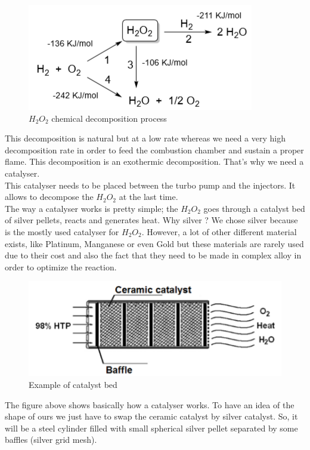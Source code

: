 \begin{figure}[H]
	\centering
	\includegraphics{H2O2}
	\caption{$H_2O_2$ chemical decomposition process}
\end{figure}

This decomposition is natural but at a low rate whereas we need a very high decomposition rate in order to feed the combustion chamber and sustain a proper flame. This decomposition is an exothermic decomposition. That's why we need a catalyser. \\

This catalyser needs to be placed between the turbo pump and the injectors. It allows to decompose the $H_2O_2$ at the last time. \\

The way a catalyser works is pretty simple; the $H_2O_2$ goes through a catalyst bed of silver pellets, reacts and generates heat. 
Why silver ? We chose silver because is the mostly used catalyser for $H_2O_2$. However, a lot of other different material exists, like Platinum, Manganese or even Gold but these materials are rarely used due to their cost and also the fact that they need to be made in complex alloy in order to optimize the reaction. 

\begin{figure}[H]
	\centering
	\includegraphics{catalyst}
	\caption{Example of catalyst bed}
\end{figure}

The figure above shows basically how a catalyser works. To have an idea of the shape of ours we just have to swap the ceramic catalyst by silver catalyst. So, it will be a steel cylinder filled with small spherical silver pellet separated by some baffles (silver grid mesh). \\

